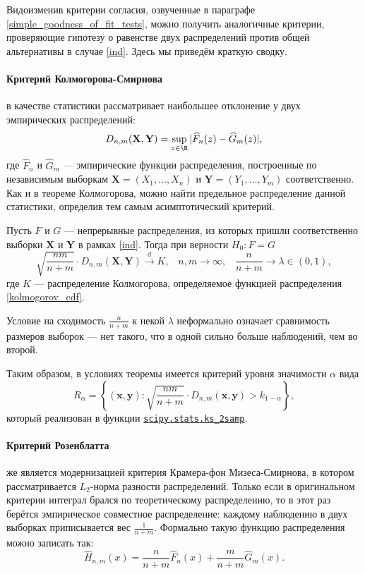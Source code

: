 Видоизменив критерии согласия, озвученные в параграфе \ref{simple_goodness_of_fit_tests}, можно получить аналогичные критерии, проверяющие гипотезу о равенстве двух распределений против общей альтернативы в случае \ref{ind}. Здесь мы приведём краткую сводку.

\paragraph{Критерий Колмогорова-Смирнова} в качестве статистики рассматривает наибольшее отклонение у двух эмпирических распределений:
\[
D_{n, m}(\mathbf X, \mathbf Y) = \sup_{z \in \R} |\widehat{F}_n(z) - \widehat{G}_m(z)|,
\]
где $\widehat{F}_n$ и $\widehat{G}_m$ --- эмпирические функции распределения, построенные по независимым выборкам $\mathbf X = (X_1, \ldots, X_n)$ и $\mathbf Y = (Y_1, \ldots, Y_m)$ соответственно. Как и в теореме Колмогорова, можно найти предельное распределение данной статистики, определив тем самым асимптотический критерий.

\begin{theorem}{}{}
	Пусть $F$ и $G$ --- непрерывные распределения, из которых пришли соответственно выборки $\mathbf X$ и $\mathbf Y$ в рамках \ref{ind}. Тогда при верности $H_0\colon F = G$
	\[
	\sqrt{\frac{nm}{n+m}} \cdot D_{n, m}(\mathbf X, \mathbf Y) \stackrel{d}{\longrightarrow} K, \;\;\;n, m \to \infty, \;\;\; \frac{n}{n+m} \to \lambda \in (0,1),
	\]
	где $K$ --- распределение Колмогорова, определяемое функцией распределения \eqref{kolmogorov_cdf}.
\end{theorem}

Условие на сходимость $\frac{n}{n+m}$ к некой $\lambda$ неформально означает сравнимость размеров выборок --- нет такого, что в одной сильно больше наблюдений, чем во второй.

Таким образом, в условиях теоремы имеется критерий уровня значимости $\alpha$ вида
\[
R_{\alpha} = \left\{(\mathbf x, \mathbf y)\colon \sqrt{\frac{nm}{n+m}} \cdot D_{n, m}(\mathbf x, \mathbf y) > k_{1-\alpha}\right\},
\]
который реализован в функции \href{https://docs.scipy.org/doc/scipy/reference/generated/scipy.stats.ks\_2samp.html}{\texttt{scipy.stats.ks\_2samp}}.

\paragraph{Критерий Розенблатта} же является модернизацией критерия Крамера-фон Мизеса-Смирнова, в котором рассматривается $L_2$-норма разности распределений. Только если в оригинальном критерии интеграл брался по теоретическому распределению, то в этот раз берётся эмпирическое совместное распределение: каждому наблюдению в двух выборках приписывается вес $\frac{1}{n+m}$. Формально такую функцию распределения можно записать так:
\[
\widehat{H}_{n,m}(x) = \frac{n}{n+m}\widehat{F}_n(x) + \frac{m}{n+m}\widehat{G}_m(x).
\]


